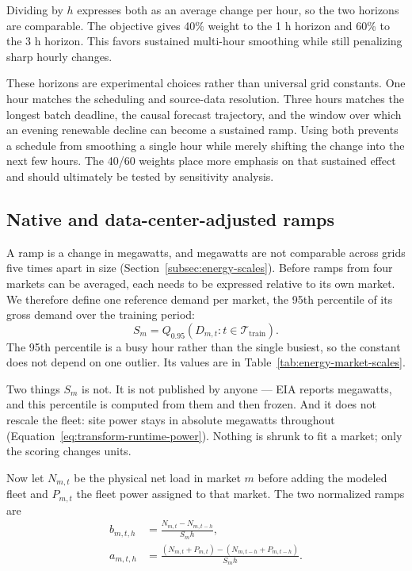 ﻿\documentclass[12pt]{article}
\begin{document}
Dividing by \(h\) expresses both as an average change per hour, so the two
horizons are comparable. The objective gives 40\% weight to the 1 h horizon
and 60\% to the 3 h horizon. This favors sustained multi-hour smoothing while
still penalizing sharp hourly changes.

These horizons are experimental choices rather than universal grid constants.
One hour matches the scheduling and source-data resolution. Three hours matches
the longest batch deadline, the causal forecast trajectory, and the window over
which an evening renewable decline can become a sustained ramp. Using both
prevents a schedule from smoothing a single hour while merely shifting the
change into the next few hours. The 40/60 weights place more emphasis on that
sustained effect and should ultimately be tested by sensitivity analysis.

\subsection{Native and data-center-adjusted ramps}
\label{subsec:objective-native-adjusted}

A ramp is a change in megawatts, and megawatts are not comparable across grids
five times apart in size (Section~\ref{subsec:energy-scales}). Before ramps from
four markets can be averaged, each needs to be expressed relative to its own
market. We therefore define one reference demand per market, the 95th percentile
of its gross demand over the training period:
\begin{equation}
  S_m
  =
  Q_{0.95}
  \left(
    D_{m,t}: t \in \mathcal{T}_{\mathrm{train}}
  \right).
  \label{eq:energy-market-scale}
\end{equation}
The 95th percentile is a busy hour rather than the single busiest, so the
constant does not depend on one outlier. Its values are in
Table~\ref{tab:energy-market-scales}.

Two things \(S_m\) is not. It is not published by anyone --- EIA reports
megawatts, and this percentile is computed from them and then frozen. And it
does not rescale the fleet: site power stays in absolute megawatts throughout
(Equation~\eqref{eq:transform-runtime-power}). Nothing is shrunk to fit a
market; only the scoring changes units.

Now let \(N_{m,t}\) be the physical net load in market \(m\) before adding the
modeled fleet and \(P_{m,t}\) the fleet power assigned to that market. The two
normalized ramps are
\begin{align}
  b_{m,t,h}
    &= \frac{N_{m,t}-N_{m,t-h}}{S_m h}, \\
  a_{m,t,h}
    &= \frac{(N_{m,t}+P_{m,t})-(N_{m,t-h}+P_{m,t-h})}{S_m h}.
  \label{eq:energy-ramps}
\end{align}
\end{document}
